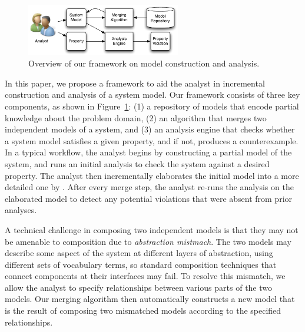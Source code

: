 \begin{figure}[!t]
\centering
\includegraphics[width=0.60\textwidth]{diagrams/overview}
\caption{Overview of our framework on model construction and analysis.}
\label{fig-overview}
\end{figure}

In this paper, we propose a framework to aid the analyst in
incremental construction and analysis of a system model. Our framework
consists of three key components, as shown in
Figure~\ref{fig-overview}: (1) a repository of models that encode
partial knowledge about the problem domain, (2) an algorithm that
merges two independent models of a system, and (3) an analysis engine
that checks whether a system model satisfies a given property, and if
not, produces a counterexample. In a typical workflow, the analyst
begins by constructing a partial model of the system, and runs an
initial analysis to check the system against a desired property. The
analyst then incrementally elaborates the initial model into a more
detailed one by . After every merge step, the analyst re-runs the analysis on
the elaborated model to detect any potential violations that were
absent from prior analyses.

A technical challenge in composing two independent models is that they
may not be amenable to composition due to \textit{abstraction
  mistmach}. The two models may describe some aspect of the system
at different layers of abstraction, using different sets of vocabulary
terms, so standard composition techniques that connect components at
their interfaces may fail. To resolve this mismatch, we allow the
analyst to specify relationships between various parts of the two
models. Our merging algorithm then automatically constructs a new
model that is the result of composing two mismatched models according
to the specified relationships.

